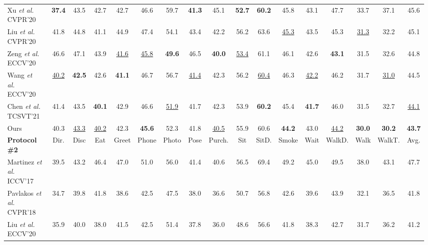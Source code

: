 \documentclass[journal]{IEEEtran}
\begin{document}
\begin{table*}[t]
{\begin{tabular}{@{}l|ccccccccccccccc|c@{}}
Xu \emph{et al.}~\cite{xu2020deep} CVPR'20 & \textbf{37.4} & {43.5}& 42.7& {42.7}& 46.6& 59.7& \textbf{41.3} &45.1 &\textbf{52.7} &\textbf{60.2} & 45.8& 43.1& 47.7& 33.7& 37.1& 45.6 \\
   
Liu \emph{et al.}~\cite{liu2020attention} CVPR'20   &41.8 &44.8 &{41.1} &44.9 &47.4 &54.1 &43.4 &42.2 &56.2 &63.6 &\underline{45.3} &43.5 &{45.3} &\underline{31.3} &32.2 &45.1 \\

Zeng \emph{et al.}~\cite{zeng2020srnet} ECCV'20  & 46.6& 47.1& 43.9& \underline{41.6}& \underline{45.8} & \textbf{49.6} & 46.5& \textbf{40.0}&\underline{53.4} & 61.1& 46.1& 42.6& \textbf{43.1}& 31.5& 32.6& 44.8 \\

Wang \emph{et al.}~\cite{wang2020motion} ECCV'20   &\underline{40.2} &\textbf{42.5} &42.6 &\textbf{41.1} &46.7 &56.7 &\underline{41.4} &42.3 &56.2 &\underline{60.4} &46.3 &\underline{42.2} &46.2 &31.7 &\underline{31.0} &44.5 \\

Chen \emph{et al.}~\cite{chen2021anatomy} TCSVT'21   &41.4 &{43.5} &\textbf{40.1} &42.9 &46.6 &\underline{51.9} &41.7 &42.3 &53.9 &\textbf{60.2} &45.4 &\textbf{41.7} &46.0 &31.5 &32.7 &\underline{44.1} \\
      
      \midrule[0.5pt]

      Ours  &{40.3} &\underline{43.3} &\underline{40.2} &{42.3} &\textbf{45.6} &{52.3} &{41.8} &\underline{40.5} &{55.9} &{60.6} &\textbf{44.2} &{43.0} &\underline{44.2} &\textbf{30.0} &\textbf{30.2} &\textbf{43.7} \\

      \toprule[1pt]

      \textbf{Protocol \#2} & Dir. & Disc & Eat & Greet & Phone & Photo & Pose & Purch. & Sit & SitD. & Smoke & Wait & WalkD. & Walk & WalkT. & Avg.\\
      \midrule[0.5pt]

Martinez \emph{et al.}~\cite{martinez2017simple} ICCV'17  &39.5 &43.2 &46.4 &47.0 &51.0 &56.0 &41.4 &40.6 &56.5 &69.4 &49.2 &45.0 &49.5 &38.0 &43.1 &47.7 \\

Pavlakos \emph{et al.}~\cite{pavlakos2018ordinal} CVPR'18  &34.7 &39.8 &41.8 &38.6 &42.5 &47.5 &38.0 &36.6 &50.7 &56.8 &42.6 &39.6 &43.9 &32.1 &36.5 &41.8 \\

Liu \emph{et al.}~\cite{liu2020comprehensive} ECCV'20  &35.9 &40.0 &38.0 &41.5 &42.5 &51.4 &37.8 &36.0 &48.6 &56.6 &41.8 &38.3 &42.7 &31.7 &36.2 &41.2 \\


\end{tabular}}
\end{table*}
\end{document}
